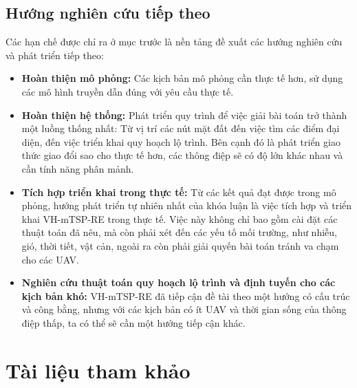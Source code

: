 \documentclass[a4paper]{article}
\begin{document}
\subsection{Hướng nghiên cứu tiếp theo}
Các hạn chế được chỉ ra ở mục trước là nền tảng đề xuất các hướng nghiên cứu và phát triển tiếp theo:
\begin{itemize}
  \item {\bfseries Hoàn thiện mô phỏng:} Các kịch bản mô phỏng cần thực tế hơn, sử dụng các mô hình truyền dẫn đúng với yêu cầu thực tế. 
  \item {\bfseries Hoàn thiện hệ thống:} Phát triển quy trình để việc giải bài toán trở thành một luồng thống nhất: Từ vị trí các nút mặt đất đến việc tìm các điểm đại diện, đến việc triển khai quy hoạch lộ trình. Bên cạnh đó là phát triển giao thức giao đổi sao cho thực tế hơn, các thông điệp sẽ có độ lớn khác nhau và cần tính năng phân mảnh.
  \item {\bfseries Tích hợp triển khai trong thực tế:} Từ các kết quả đạt được trong mô phỏng, hướng phát triển tự nhiên nhất của khóa luận là việc tích hợp và triển khai VH-mTSP-RE trong thực tế. Việc này không chỉ bao gồm cài đặt các thuật toán đã nêu, mà còn phải xét đến các yếu tố mối trường, như nhiễu, gió, thời tiết, vật cản, ngoài ra còn phải giải quyến bài toán tránh va chạm cho các UAV.
  \item {\bfseries Nghiên cứu thuật toán quy hoạch lộ trình và định tuyến cho các kịch bản khó:} VH-mTSP-RE đã tiếp cận đề tài theo một hướng có cấu trúc và công bằng, nhưng với các kịch bản có ít UAV và thời gian sống của thông điệp thấp, ta có thể sẽ cần một hướng tiếp cận khác. 
\end{itemize}

\renewcommand{\refname}{\vspace{-1cm}}
\section*{Tài liệu tham khảo}
\printbibliography
\end{document}
